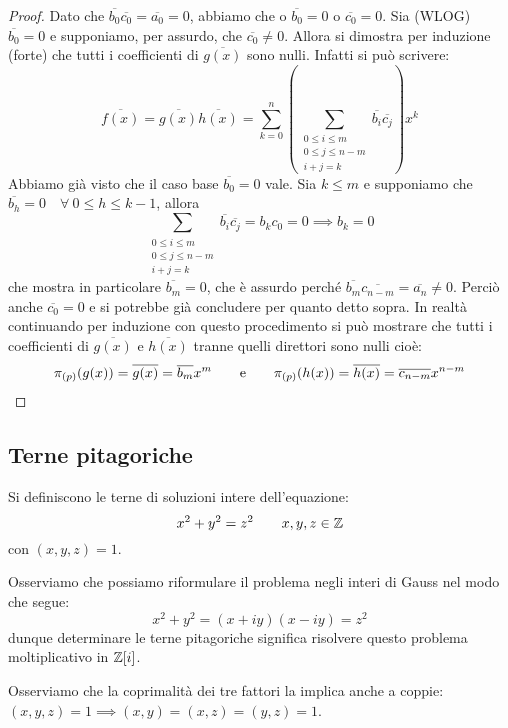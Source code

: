 \documentclass[11pt]{scrartcl}
\begin{document}
\begin{proof}
    Dato che $\overline{b_0}\overline{c_0} = \overline{a_0} = 0$, abbiamo che o $\overline{b_0} = 0$ o $\overline{c_0} = 0$.
    Sia (WLOG) $\overline{b_0} = 0$ e supponiamo, per assurdo, che $\overline{c_0} \neq 0$. 
    Allora si dimostra per induzione (forte) che tutti i coefficienti di $\overline{g(x)}$ sono nulli. Infatti si può scrivere: 
        \[ \overline{f(x)} = \overline{g(x)}\overline{h(x)} = 
	   \sum_{k = 0}^{n} ( \sum_{\substack{0 \leq i \leq m \\ 0 \leq j \leq n-m \\ i+j = k}} \overline{b_i}\overline{c_j} )x^k
            \]
    Abbiamo già visto che il caso base $\overline{b_0} = 0$ vale. Sia $k \leq m$ e supponiamo che $\overline{b_h} = 0 \quad \forall ~ 0 \leq h \leq k-1$, allora 
        \[ \sum_{\substack{0 \leq i \leq m \\ 0 \leq j \leq n-m \\ i+j = k}} \overline{b_i}\overline{c_j} 
	   = b_{k}c_0 = 0 \implies b_{k} = 0
            \]
    che mostra in particolare $\overline{b_m} = 0$, che è assurdo perché $\overline{b_m}\overline{c_{n-m}} = \overline{a_n} \neq 0$.
    Perciò anche $\overline{c_0} = 0$ e si potrebbe già concludere per quanto detto sopra. 
    In realtà continuando per induzione con questo procedimento si può mostrare che tutti i coefficienti di $\overline{g(x)}$ e $\overline{h(x)}$ tranne quelli direttori sono nulli cioè: 
        \[ \pi_{(p)}(g(x)) = \overline{g(x)} = \overline{b_m}x^m 
	   \qquad \text e \qquad 
	   \pi_{(p)}(h(x)) = \overline{h(x)} = \overline{c_{n-m}}x^{n-m}
            \]
\end{proof}

\newpage
\subsection{Terne pitagoriche}
\begin{definition}
    Si definiscono  le terne di soluzioni intere dell'equazione:
    \[ x^2 + y^2 = z^2 \qquad x,y,z \in \mathbb Z
        \]
    con  $(x,y,z) = 1$.
\end{definition}

Osserviamo che possiamo riformulare il problema negli interi di Gauss nel modo che segue:
\[ x^2+y^2 = (x+iy)(x-iy) = z^2
    \]
dunque determinare le terne pitagoriche significa risolvere questo problema moltiplicativo in $\mathbb Z[i]$.

\begin{remark}
    Osserviamo che la coprimalità dei tre fattori la implica anche a coppie: $(x,y,z) = 1 \implies (x,y) = (x,z) = (y,z) = 1$.
\end{remark}
\end{document}
